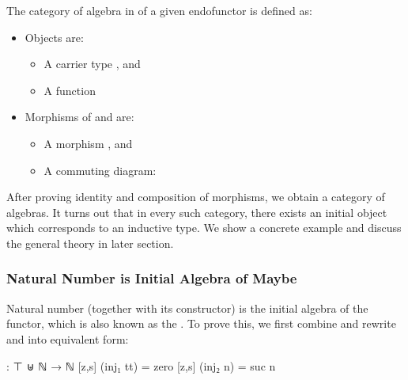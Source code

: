 The category of algebra in  of a given endofunctor  \AgdaSymbol{:}    is defined as:
\begin{itemize}
  \item{Objects are:}
  \begin{itemize}
    \item{A carrier type  \AgdaSymbol{:} }, and
    \item{A function  \AgdaSymbol{:}    }
  \end{itemize}
  \item{Morphisms of \AgdaSymbol{(} \AgdaInductiveConstructor{,} \AgdaSymbol{)} and \AgdaSymbol{(} \AgdaInductiveConstructor{,} \AgdaSymbol{)} are:}
  \begin{itemize}
    \item{A morphism  \AgdaSymbol{:}   }, and
    \item{A commuting diagram:}
  \end{itemize}
\end{itemize}

After proving identity and composition of morphisms, we obtain a category of algebras. It turns out that in every such category, there exists an initial object which corresponds to an inductive type. We show a concrete example and discuss the general theory in later section.

\subsubsection*{Natural Number is Initial Algebra of Maybe}

Natural number (together with its constructor) is the initial algebra of the  functor, which is also known as the . To prove this, we first combine and rewrite  and  into equivalent form:

\begin{code}
[z,s] : ⊤ ⊎ ℕ → ℕ
[z,s] (inj₁ tt) = zero
[z,s] (inj₂ n) = suc n
\end{code}

